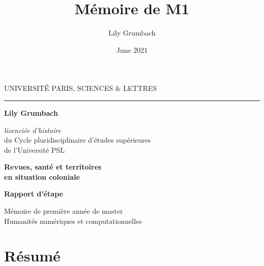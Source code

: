 \documentclass[a4paper,oneside,12pt]{book}
\title{Mémoire de M1}
\author{Lily Grumbach}
\date{June 2021}
\begin{document}
\frontmatter

\begin{titlepage}
\begin{center}

\bigskip

\begin{large}
UNIVERSITÉ PARIS, SCIENCES \& LETTRES
\end{large}
\begin{center}\rule{2cm}{0.02cm}\end{center}

\bigskip
\bigskip
\bigskip
\begin{Large}
\textbf{Lily Grumbach}\\
\end{Large}
\begin{normalsize} \textit{licenciée d'histoire}\\
 du Cycle pluridisciplinaire d'études supérieures\\
 de l'Université PSL
\end{normalsize}

\bigskip
\bigskip
\bigskip

\begin{Huge}
\textbf{Revues, santé et territoires}\\
\textbf{en situation coloniale}\\
\end{Huge}
\bigskip
\begin{LARGE}
\textbf{Rapport d'étape}\\
\end{LARGE}

\bigskip
\bigskip
\bigskip
\begin{large}
\end{large}
\vfill

\begin{large}
Mémoire de première année de master\\
\og Humanités numériques et computationnelles \fg{} \\
\end{large}

\end{center}
\end{titlepage}

\thispagestyle{empty}

\cleardoublepage

\section*{Résumé}
\end{document}
